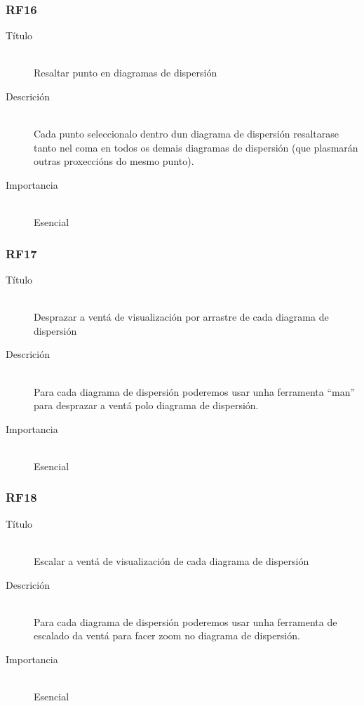 \subsubsection*{RF16}
\begin{description}
\item[Título] \hfill \\
Resaltar punto en diagramas de dispersión
\item[Descrición] \hfill \\
Cada punto seleccionalo dentro dun diagrama de dispersión resaltarase tanto nel coma en todos os demais diagramas de dispersión (que plasmarán outras proxeccións do mesmo punto).
\item[Importancia] \hfill \\
Esencial
\end{description}

\subsubsection*{RF17}
\begin{description}
\item[Título] \hfill \\
Desprazar a ventá de visualización por arrastre de cada diagrama de dispersión
\item[Descrición] \hfill \\
Para cada diagrama de dispersión poderemos usar unha ferramenta ``man'' para desprazar a ventá polo diagrama de dispersión.
\item[Importancia] \hfill \\
Esencial
\end{description}

\subsubsection*{RF18}
\begin{description}
\item[Título] \hfill \\
Escalar a ventá de visualización de cada diagrama de dispersión
\item[Descrición] \hfill \\
Para cada diagrama de dispersión poderemos usar unha ferramenta de escalado da ventá para facer zoom no diagrama de dispersión.
\item[Importancia] \hfill \\
Esencial
\end{description}

